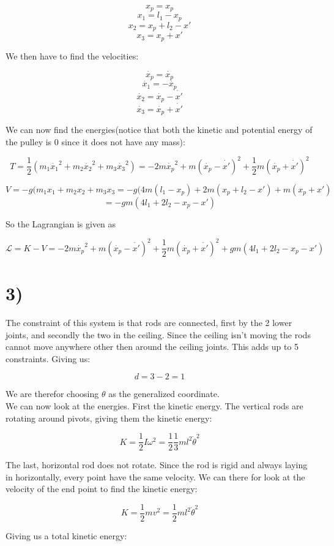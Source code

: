 \documentclass[a4paper,norsk, 10pt]{article}
\begin{document}
$$
x_p = x_p
$$
$$
x_1 = l_1 - x_p
$$
$$
x_2 = x_p + l_2 - x'
$$
$$
x_3 = x_p + x'
$$

We then have to find the velocities:

$$
\dot{x_p} = \dot{x_p}
$$
$$
\dot{x_1} = -\dot{x_p}
$$
$$
\dot{x_2} = \dot{x_p} - \dot{x'}
$$
$$
\dot{x_3} = \dot{x_p} + \dot{x'}
$$

We can now find the energies(notice that both the kinetic and potential energy of the pulley is 0 since it does not have any mass):

$$
T = \frac{1}{2}(m_1\dot{x_1}^2 + m_2\dot{x_2}^2 + m_3\dot{x_3}^2) = -2m\dot{x_p}^2 + m(\dot{x_p} - \dot{x'})^2 + \frac{1}{2}m(\dot{x_p} + \dot{x'})^2
$$

$$
V = -g(m_1x_1 + m_2x_2 + m_3x_3 = -g(4m(l_1 - x_p) + 2m(x_p + l_2 - x') + m(x_p + x') 
$$
$$
= -gm(4l_1 +2l_2 - x_p -x') 
$$

So the Lagrangian is given as

$$
\mathcal{L} = K - V = -2m\dot{x_p}^2 + m(\dot{x_p} - \dot{x'})^2 + \frac{1}{2}m(\dot{x_p} + \dot{x'})^2 + gm(4l_1 +2l_2 - x_p -x') 
$$

\section*{3)}

The constraint of this system is that rods are connected, first by the 2 lower joints, and secondly the two in the ceiling. Since the ceiling isn't moving the rods cannot move anywhere other then around the ceiling joints. This adds up to 5 constraints. Giving us:

$$
d = 3 -2 = 1
$$

We are therefor choosing $\theta$ as the generalized coordinate.\\

We can now look at the energies. First the kinetic energy. The vertical rods are rotating around pivots, giving them the kinetic energy:

$$
K = \frac{1}{2}I\omega^2 = \frac{1}{2}\frac{1}{3}ml^2\dot{\theta}^2
$$

The last, horizontal rod does not rotate. Since the rod is rigid and always laying in horizontally, every point have the same velocity. We can there for look at the velocity of the end point to find the kinetic energy:

$$
K = \frac{1}{2}mv^2 = \frac{1}{2}ml^2\dot{\theta}^2
$$

Giving us a total kinetic energy:
\end{document}
